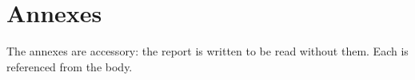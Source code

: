 \documentclass[11pt,a4paper]{article}
\begin{document}
\hypersetup{pageanchor=false}



\cleardoublepage
\hypersetup{pageanchor=true}
\tableofcontents
\clearpage


\clearpage

\cleardoublepage
{}













\clearpage


\clearpage
\appendix
\renewcommand{\thesection}{\Alph{section}}
\setcounter{section}{0}
\section*{Annexes}
The annexes are accessory: the report is written to be read without them. Each is referenced from the body.








\clearpage

\end{document}
